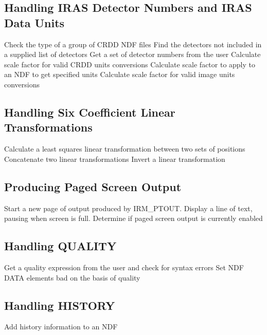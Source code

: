 \subsection {Handling IRAS Detector Numbers and IRAS Data Units}
  {Check the type of a group of CRDD NDF files}
  {Find the detectors not included in a supplied list of detectors}
  {Get a set of detector numbers from the user}
  {Calculate scale factor for valid CRDD units conversions}
  {Calculate scale factor to apply to an NDF to get specified units}
  {Calculate scale factor for valid image units conversions}


\subsection {Handling Six Coefficient Linear Transformations}
  {Calculate a least squares linear transformation between two sets of
   positions}
  {Concatenate two linear transformations}
  {Invert a linear transformation}


\subsection{Producing Paged Screen Output}
  {Start a new page of output produced by IRM\_PTOUT.}
  {Display a line of text, pausing when screen is full.}
  {Determine if paged screen output is currently enabled}

\subsection {Handling QUALITY}
  {Get a quality expression from the user and check for syntax errors}
  {Set NDF DATA elements bad on the basis of quality}


\subsection {Handling HISTORY}
  {Add history information to an NDF}


